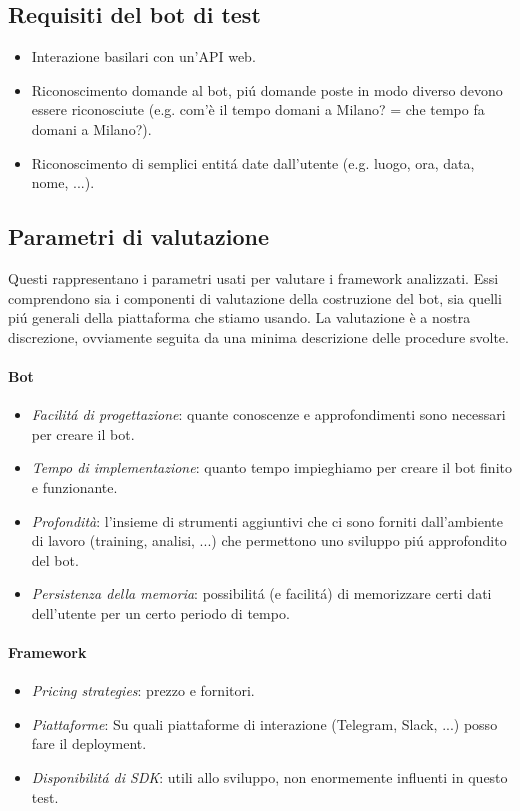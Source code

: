 \documentclass[]{article}
\begin{document}
\subsection{Requisiti del bot di test}
\begin{itemize}
\item Interazione basilari con un’API web.
\item Riconoscimento domande al bot, piú domande poste in modo diverso devono essere riconosciute (e.g. com'è il tempo domani a Milano? = che tempo fa domani a Milano?).
\item Riconoscimento di semplici entitá date dall’utente (e.g. luogo, ora, data, nome, ...).
\end{itemize}

\subsection{Parametri di valutazione}
Questi rappresentano i parametri usati per valutare i framework analizzati. Essi comprendono sia i componenti di valutazione della costruzione del bot, sia quelli piú generali della piattaforma che stiamo usando. La valutazione è a nostra discrezione, ovviamente seguita da una minima descrizione delle procedure svolte.

\paragraph{Bot}
\begin{itemize}
\item \textit{Facilitá di progettazione}: quante conoscenze e approfondimenti sono necessari per creare il bot.
\item \textit{Tempo di implementazione}: quanto tempo impieghiamo per creare il bot finito e funzionante.
\item \textit{Profondità}: l’insieme di strumenti aggiuntivi che ci sono forniti dall’ambiente di lavoro (training, analisi, ...) che permettono uno sviluppo piú approfondito del bot.
\item \textit{Persistenza della memoria}: possibilitá (e facilitá) di memorizzare certi dati dell’utente per un certo periodo di tempo.
\end{itemize}

\paragraph{Framework}
\begin{itemize}
\item \textit{Pricing strategies}: prezzo e fornitori.
\item \textit{Piattaforme}: Su quali piattaforme di interazione (Telegram, Slack, ...) posso fare il deployment.
\item \textit{Disponibilitá di SDK}: utili allo sviluppo, non enormemente influenti in questo test.
\end{itemize}
\end{document}
